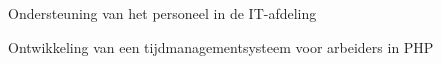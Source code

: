 \documentclass[a4paper]{deedy-resume} %
\begin{document}
\begin{minipage}[t]{0.60\textwidth}
\sectionspace %



\begin{tightitemize}
\item Ondersteuning van het personeel in de IT-afdeling
\item Ontwikkeling van een tijdmanagementsysteem voor arbeiders in PHP
\end{tightitemize}

\sectionspace %




\sectionspace %



\end{minipage} %








\end{document}
